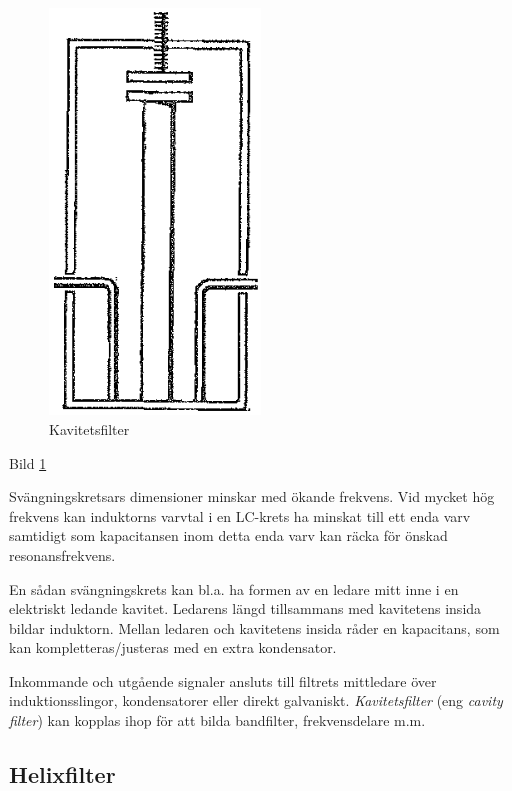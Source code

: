 \begin{figure}
\includegraphics[width=0.5\textwidth]{images/bild_2_3-31.png}
\caption{Kavitetsfilter}
\label{fig:BildII3-31}
\end{figure}

Bild \ref{fig:BildII3-31}

Svängningskretsars dimensioner minskar med ökande frekvens. Vid mycket hög
frekvens kan induktorns varvtal i en LC-krets ha minskat till ett enda varv
samtidigt som kapacitansen inom detta enda varv kan räcka för önskad
resonansfrekvens.

En sådan svängningskrets kan bl.a. ha formen av en ledare mitt inne i en
elektriskt ledande kavitet. Ledarens längd tillsammans med kavitetens insida
bildar induktorn. Mellan ledaren och kavitetens insida råder en kapacitans,
som kan kompletteras/justeras med en extra kondensator.

Inkommande och utgående signaler ansluts till filtrets mittledare över
induktionsslingor, kondensatorer eller direkt galvaniskt. \emph{Kavitetsfilter} (eng
\emph{cavity filter}) kan kopplas ihop för att bilda bandfilter, frekvensdelare
m.m.

\subsection{Helixfilter}

